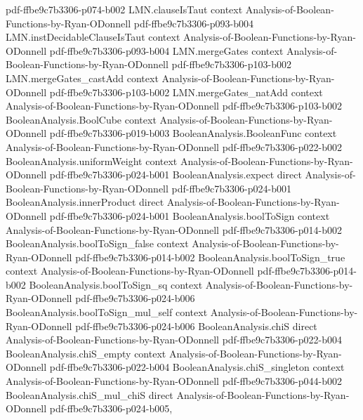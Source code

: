 \begin{lemma}
  {pdf-ffbe9c7b3306-p074-b002}
\proofstep
  {LMN.clauseIsTaut}
  {context}
  {Analysis-of-Boolean-Functions-by-Ryan-ODonnell}
  {pdf-ffbe9c7b3306-p093-b004}
\proofstep
  {LMN.instDecidableClauseIsTaut}
  {context}
  {Analysis-of-Boolean-Functions-by-Ryan-ODonnell}
  {pdf-ffbe9c7b3306-p093-b004}
\proofstep
  {LMN.mergeGates}
  {context}
  {Analysis-of-Boolean-Functions-by-Ryan-ODonnell}
  {pdf-ffbe9c7b3306-p103-b002}
\proofstep
  {LMN.mergeGates_castAdd}
  {context}
  {Analysis-of-Boolean-Functions-by-Ryan-ODonnell}
  {pdf-ffbe9c7b3306-p103-b002}
\proofstep
  {LMN.mergeGates_natAdd}
  {context}
  {Analysis-of-Boolean-Functions-by-Ryan-ODonnell}
  {pdf-ffbe9c7b3306-p103-b002}
\proofstep
  {BooleanAnalysis.BoolCube}
  {context}
  {Analysis-of-Boolean-Functions-by-Ryan-ODonnell}
  {pdf-ffbe9c7b3306-p019-b003}
\proofstep
  {BooleanAnalysis.BooleanFunc}
  {context}
  {Analysis-of-Boolean-Functions-by-Ryan-ODonnell}
  {pdf-ffbe9c7b3306-p022-b002}
\proofstep
  {BooleanAnalysis.uniformWeight}
  {context}
  {Analysis-of-Boolean-Functions-by-Ryan-ODonnell}
  {pdf-ffbe9c7b3306-p024-b001}
\proofstep
  {BooleanAnalysis.expect}
  {direct}
  {Analysis-of-Boolean-Functions-by-Ryan-ODonnell}
  {pdf-ffbe9c7b3306-p024-b001}
\proofstep
  {BooleanAnalysis.innerProduct}
  {direct}
  {Analysis-of-Boolean-Functions-by-Ryan-ODonnell}
  {pdf-ffbe9c7b3306-p024-b001}
\proofstep
  {BooleanAnalysis.boolToSign}
  {context}
  {Analysis-of-Boolean-Functions-by-Ryan-ODonnell}
  {pdf-ffbe9c7b3306-p014-b002}
\proofstep
  {BooleanAnalysis.boolToSign_false}
  {context}
  {Analysis-of-Boolean-Functions-by-Ryan-ODonnell}
  {pdf-ffbe9c7b3306-p014-b002}
\proofstep
  {BooleanAnalysis.boolToSign_true}
  {context}
  {Analysis-of-Boolean-Functions-by-Ryan-ODonnell}
  {pdf-ffbe9c7b3306-p014-b002}
\proofstep
  {BooleanAnalysis.boolToSign_sq}
  {context}
  {Analysis-of-Boolean-Functions-by-Ryan-ODonnell}
  {pdf-ffbe9c7b3306-p024-b006}
\proofstep
  {BooleanAnalysis.boolToSign_mul_self}
  {context}
  {Analysis-of-Boolean-Functions-by-Ryan-ODonnell}
  {pdf-ffbe9c7b3306-p024-b006}
\proofstep
  {BooleanAnalysis.chiS}
  {direct}
  {Analysis-of-Boolean-Functions-by-Ryan-ODonnell}
  {pdf-ffbe9c7b3306-p022-b004}
\proofstep
  {BooleanAnalysis.chiS_empty}
  {context}
  {Analysis-of-Boolean-Functions-by-Ryan-ODonnell}
  {pdf-ffbe9c7b3306-p022-b004}
\proofstep
  {BooleanAnalysis.chiS_singleton}
  {context}
  {Analysis-of-Boolean-Functions-by-Ryan-ODonnell}
  {pdf-ffbe9c7b3306-p044-b002}
\proofstep
  {BooleanAnalysis.chiS_mul_chiS}
  {direct}
  {Analysis-of-Boolean-Functions-by-Ryan-ODonnell}
  {pdf-ffbe9c7b3306-p024-b005,
}
\end{lemma}
